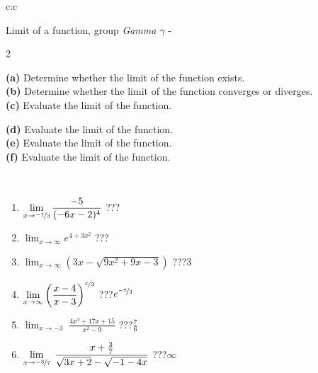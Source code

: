 \documentclass[10pt]{report}
\begin{document}
\newpage
\thispagestyle{empty}
\begin{tabular}{c:c}
\begin{minipage}[c][104.5mm][t]{0.5\linewidth}
\begin{center}
\vspace{5mm}
{\huge Limit of a function, group \textit{Gamma $\gamma$} -}\\[5mm]
\begin{minipage}{0.95\linewidth}
\begin{center}
{\small \begin{multicols}{2} \raggedright
\textbf{(a)} Determine whether the limit of the function exists. \\[1mm]
\textbf{(b)} Determine whether the limit of the function converges or diverges. \\[1mm]
\textbf{(c)} Evaluate the limit of the function. \par \columnbreak
\textbf{(d)} Evaluate the limit of the function. \\[1mm]
\textbf{(e)} Evaluate the limit of the function. \\[1mm]
\textbf{(f)} Evaluate the limit of the function. \\[1mm]
\end{multicols}
}
\end{center}
\end{minipage}
\\[1mm]
\begin{minipage}{0.79\linewidth}
\begin{center}
\begin{varwidth}{\linewidth}
\setlength{\itemsep}{0pt}
\begin{enumerate}
\normalsize
\item $\displaystyle\lim_{x\to\nicefrac{-1}{3}}{\frac{-5}{(-6x-2)^{4}}}$\quad \dotfill\; ???\;\dotfill \quad {}
\item $\displaystyle\lim_{x\to\infty}{e^{4+3x^2}}$\quad \dotfill\; ???\;\dotfill \quad {}
\item $\displaystyle\lim_{x\to\infty}{\left(3x - \sqrt{9x^2+9x-3}\right)}$\quad \dotfill\; ???\;\dotfill \quad $3$
\item $\displaystyle\lim_{x\to\infty}{\left( \frac{x-4}{x-3} \right)^{\nicefrac{x}{3}}}$\quad \dotfill\; ???\;\dotfill \quad $e^{\nicefrac{-7}{3}}$
\item $\displaystyle\lim_{x\to -3}{\;\frac{4x^2+17x+15}{x^2-9}}$\quad \dotfill\; ???\;\dotfill \quad $\frac{7}{6}$
\item $\displaystyle\lim_{x\to \nicefrac{-3}{7}}{\;\frac{x+\frac{3}{7}}{\sqrt{3x+2} - \sqrt{-1-4x}}}$\quad \dotfill\; ???\;\dotfill \quad $\infty$

\end{enumerate}
\end{varwidth}
\end{center}
\end{minipage}
\end{center}
\end{minipage}
\end{tabular}
\end{document}
